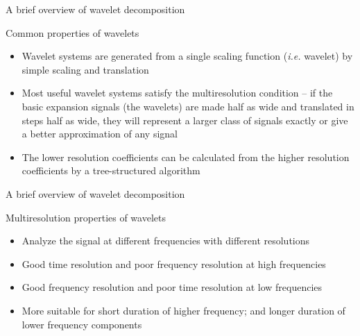 \begin{frame}{A brief overview of wavelet decomposition}

Common properties of wavelets
\begin{itemize}
	\item Wavelet systems are generated from a single scaling function (\textit{i.e.} wavelet) by simple scaling and translation
	\item Most useful wavelet systems satisfy the multiresolution condition --  if the basic expansion signals (the wavelets) are made half as wide and translated in steps half  as wide, they will represent a larger class of signals exactly or give a better approximation of any signal
	\item The lower resolution coefficients can be calculated from the higher resolution  coefficients by a tree-structured algorithm
\end{itemize}
\end{frame}


\begin{frame}{A brief overview of wavelet decomposition}

Multiresolution properties of wavelets
\begin{itemize}
	\item Analyze the signal at different frequencies with different resolutions
	\item Good time resolution and poor frequency resolution at high frequencies
	\item Good frequency resolution and poor time resolution at low frequencies
	\item More suitable for short duration of higher frequency; and longer duration of lower frequency components
\end{itemize}
\end{frame}



